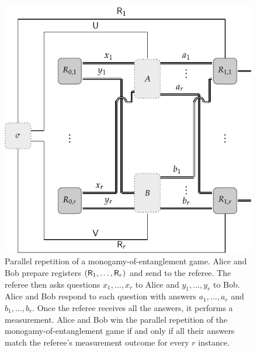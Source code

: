 \begin{figure}[!htpb] 
	\begin{center}
		\includegraphics[scale=0.9]{figures/extended_nonlocal_game_parallel_repetition_2.pdf}
	\end{center}
		\caption[Parallel repetition of a monogamy-of-entanglement game.]{Parallel repetition of a monogamy-of-entanglement game. Alice and Bob prepare registers $(\mathsf{R}_1, \ldots, \mathsf{R}_r)$ and send to the referee. The referee then asks questions $x_1, \ldots, x_r$ to Alice and $y_1, \ldots, y_r$ to Bob. Alice and Bob respond to each question with answers $a_1, \ldots, a_r$ and $b_1, \ldots, b_r$. Once the referee receives all the answers, it performs a measurement. Alice and Bob win the parallel repetition of the monogamy-of-entanglement game if and only if all their answers match the referee's measurement outcome for every $r$ instance.}
		\label{fig:parallel-rep-monogamy-game}
\end{figure}

